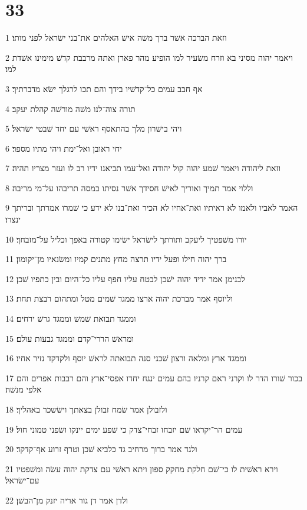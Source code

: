 \chapter{33}

\par 1 וזאת הברכה אשׁר ברך משׁה אישׁ האלהים את־בני ישׂראל לפני מותו׃
\par 2 ויאמר יהוה מסיני בא וזרח משׂעיר למו הופיע מהר פארן ואתה מרבבת קדשׁ מימינו אשׁדת למו׃
\par 3 אף חבב עמים כל־קדשׁיו בידך והם תכו לרגלך ישׂא מדברתיך׃
\par 4 תורה צוה־לנו משׁה מורשׁה קהלת יעקב׃
\par 5 ויהי בישׁרון מלך בהתאסף ראשׁי עם יחד שׁבטי ישׂראל׃
\par 6 יחי ראובן ואל־ימת ויהי מתיו מספר׃
\par 7 וזאת ליהודה ויאמר שׁמע יהוה קול יהודה ואל־עמו תביאנו ידיו רב לו ועזר מצריו תהיה׃
\par 8 וללוי אמר תמיך ואוריך לאישׁ חסידך אשׁר נסיתו במסה תריבהו על־מי מריבה׃
\par 9 האמר לאביו ולאמו לא ראיתיו ואת־אחיו לא הכיר ואת־בנו לא ידע כי שׁמרו אמרתך ובריתך ינצרו׃
\par 10 יורו משׁפטיך ליעקב ותורתך לישׂראל ישׂימו קטורה באפך וכליל על־מזבחך׃
\par 11 ברך יהוה חילו ופעל ידיו תרצה מחץ מתנים קמיו ומשׂנאיו מן־יקומון׃
\par 12 לבנימן אמר ידיד יהוה ישׁכן לבטח עליו חפף עליו כל־היום ובין כתפיו שׁכן׃
\par 13 וליוסף אמר מברכת יהוה ארצו ממגד שׁמים מטל ומתהום רבצת תחת׃
\par 14 וממגד תבואת שׁמשׁ וממגד גרשׁ ירחים׃
\par 15 ומראשׁ הררי־קדם וממגד גבעות עולם׃
\par 16 וממגד ארץ ומלאה ורצון שׁכני סנה תבואתה לראשׁ יוסף ולקדקד נזיר אחיו׃
\par 17 בכור שׁורו הדר לו וקרני ראם קרניו בהם עמים ינגח יחדו אפסי־ארץ והם רבבות אפרים והם אלפי מנשׁה׃
\par 18 ולזבולן אמר שׂמח זבולן בצאתך וישׂשכר באהליך׃
\par 19 עמים הר־יקראו שׁם יזבחו זבחי־צדק כי שׁפע ימים יינקו ושׂפני טמוני חול׃
\par 20 ולגד אמר ברוך מרחיב גד כלביא שׁכן וטרף זרוע אף־קדקד׃
\par 21 וירא ראשׁית לו כי־שׁם חלקת מחקק ספון ויתא ראשׁי עם צדקת יהוה עשׂה ומשׁפטיו עם־ישׂראל׃
\par 22 ולדן אמר דן גור אריה יזנק מן־הבשׁן׃
